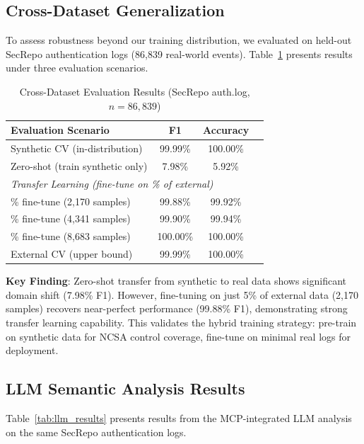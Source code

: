 \documentclass[11pt,conference]{IEEEtran}
\begin{document}
\subsection{Cross-Dataset Generalization}

To assess robustness beyond our training distribution, we evaluated on held-out SecRepo authentication logs (86,839 real-world events). Table~\ref{tab:cross_dataset} presents results under three evaluation scenarios.

\begin{table}[!t]
\centering
\caption{Cross-Dataset Evaluation Results (SecRepo auth.log, $n=86,839$)}
\label{tab:cross_dataset}
\begin{tabular}{@{}lccc@{}}
\toprule
\textbf{Evaluation Scenario} & \textbf{F1} & \textbf{Accuracy} \\
\midrule
Synthetic CV (in-distribution) & 99.99\% & 100.00\% \\
Zero-shot (train synthetic only) & 7.98\% & 5.92\% \\
\midrule
\multicolumn{3}{l}{\textit{Transfer Learning (fine-tune on \% of external)}} \\
\quad 5\% fine-tune (2,170 samples) & 99.88\% & 99.92\% \\
\quad 10\% fine-tune (4,341 samples) & 99.90\% & 99.94\% \\
\quad 20\% fine-tune (8,683 samples) & 100.00\% & 100.00\% \\
\midrule
External CV (upper bound) & 99.99\% & 100.00\% \\
\bottomrule
\end{tabular}
\end{table}

\textbf{Key Finding}: Zero-shot transfer from synthetic to real data shows significant domain shift (7.98\% F1). However, fine-tuning on just 5\% of external data (2,170 samples) recovers near-perfect performance (99.88\% F1), demonstrating strong transfer learning capability. This validates the hybrid training strategy: pre-train on synthetic data for NCSA control coverage, fine-tune on minimal real logs for deployment.

\subsection{LLM Semantic Analysis Results}

Table~\ref{tab:llm_results} presents results from the MCP-integrated LLM analysis on the same SecRepo authentication logs.
\end{document}

